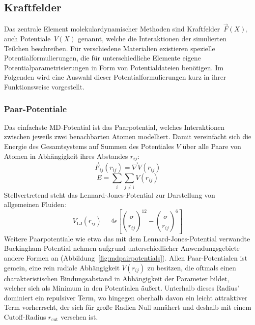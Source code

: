 \subsection{Kraftfelder}
\label{mdforcefields}

Das zentrale Element molekulardynamischer Methoden sind Kraftfelder~$\vec F(X)$, auch Potentiale~$V(X)$ genannt, welche die Interaktionen der simulierten Teilchen beschreiben\cite{hoover_molecular_1986}.
Für verschiedene Materialien existieren spezielle Potentialformulierungen, die für unterschiedliche Elemente eigene Potentialparametrisierungen in Form von Potentialdateien benötigen.
Im Folgenden wird eine Auswahl dieser Potentialformulierungen kurz in ihrer Funktionsweise vorgestellt.

\subsubsection{Paar-Potentiale}

Das einfachste MD-Potential ist das Paarpotential, welches Interaktionen zwischen jeweils zwei benachbarten Atomen modelliert.
Damit vereinfacht sich die Energie des Gesamtsystems auf Summen des Potentiales $V$ über alle Paare von Atomen in Abhängigkeit ihres Abstandes $r_{ij}$:
\begin{equation}
  \vec F_{ij}(r_{ij}) = \vec\nabla V(r_{ij})
\end{equation}
\begin{equation}
  E = \sum_i\sum_{j \neq i}{V(r_{ij})}
\end{equation}
Stellvertretend steht das Lennard-Jones-Potential zur Darstellung von allgemeinen Fluiden:
\begin{equation}
  V_\text{LJ}(r_{ij}) = 4 \epsilon \left[\left(\frac{\sigma}{r_{ij}}\right)^{12} - \left(\frac{\sigma}{r_{ij}}\right)^{6}\right]
\end{equation}
Weitere Paarpotentiale wie etwa das mit dem Lennard-Jones-Potential verwandte Bucking\-ham-Potential nehmen aufgrund unterschiedlicher Anwendungsgebiete andere Formen an (Abbildung~\ref{fig:mdpairpotentials}).
Allen Paar-Potentialen ist gemein, eine rein radiale Abhängigkeit $V(r_{ij})$ zu besitzen, die oftmals einen charakteristischen Bindungsabstand in Abhängigkeit der Parameter bildet, welcher sich als Minimum in den Potentialen äußert.
Unterhalb dieses Radius' dominiert ein repulsiver Term, wo hingegen oberhalb davon ein leicht attraktiver Term vorherrscht, der sich für große Radien Null annähert und deshalb mit einem Cutoff-Radius $r_\text{cut}$ versehen ist.

